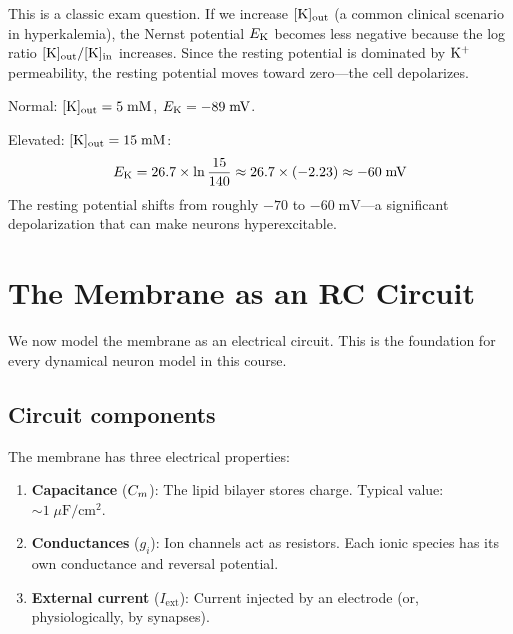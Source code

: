 This is a classic exam question. If we increase $[\mathrm{K}]_{\text{out}}$ (a common clinical scenario in hyperkalemia), the Nernst potential $E_{\mathrm{K}}$ becomes less negative because the log ratio $[\mathrm{K}]_{\text{out}}/[\mathrm{K}]_{\text{in}}$ increases. Since the resting potential is dominated by $\mathrm{K}^+$ permeability, the resting potential moves toward zero---the cell depolarizes.

\begin{aside}
Normal: $[\mathrm{K}]_{\text{out}} = 5\;\text{mM}$, $E_{\mathrm{K}} = -89\;\text{mV}$.

Elevated: $[\mathrm{K}]_{\text{out}} = 15\;\text{mM}$:
\[
  E_{\mathrm{K}} = 26.7 \times \ln\frac{15}{140} \approx 26.7 \times (-2.23) \approx -60\;\text{mV}
\]
The resting potential shifts from roughly $-70$ to $-60\;\text{mV}$---a significant depolarization that can make neurons hyperexcitable.
\end{aside}

\section{The Membrane as an RC Circuit}
\label{sec:rc-circuit}

We now model the membrane as an electrical circuit. This is the foundation for every dynamical neuron model in this course.

\subsection{Circuit components}

The membrane has three electrical properties:
\begin{enumerate}
  \item \textbf{Capacitance} ($C_m$): The lipid bilayer stores charge. Typical value: $\sim 1\;\mu\text{F}/\text{cm}^2$.
  \item \textbf{Conductances} ($g_i$): Ion channels act as resistors. Each ionic species has its own conductance and reversal potential.
  \item \textbf{External current} ($I_{\text{ext}}$): Current injected by an electrode (or, physiologically, by synapses).
\end{enumerate}

